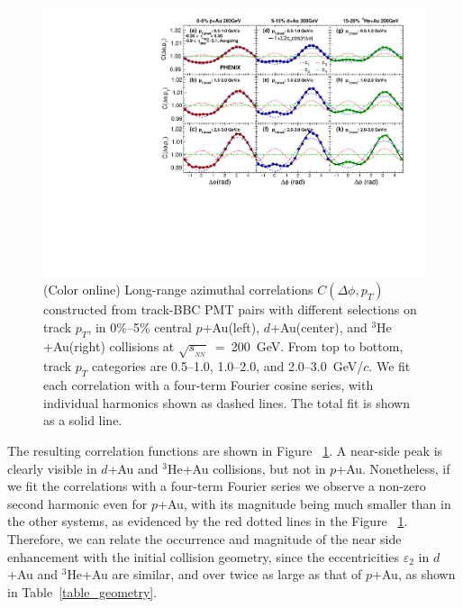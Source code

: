 \documentclass[%
reprint,
showpacs,preprintnumbers,
 amsmath,amssymb,
 aps,
]{revtex4-1}
\newcommand{\pt}{\mbox{$p_T$}\xspace}
\newcommand{\sqsn}{\mbox{$\sqrt{s_{_{NN}}}$}\xspace}
\newcommand{\dau}{\mbox{$d$+Au}\xspace}
\newcommand{\pau}{\mbox{$p$+Au}\xspace}
\newcommand{\hau}{\mbox{$^3\text{He}$+Au}\xspace}
\begin{document}
\begin{figure}[htbp]
  \includegraphics[scale=0.8]{Figures/figure1.pdf}
  \caption{(Color online) Long-range azimuthal correlations $C(\Delta\phi,p_{T})$ constructed from track-BBC PMT pairs with different selections on
track \pt, in 0\%--5\% central \pau (left), \dau (center), and \hau (right) collisions at \sqsn~=~200~GeV. From top to bottom,
track \pt categories are 0.5--1.0, 1.0--2.0, and 2.0--3.0~GeV/$c$. We fit each correlation with a four-term Fourier cosine series, with individual harmonics shown as dashed lines. The total fit is shown as a solid line.}
\label{fig:figure1}
\end{figure}

The resulting correlation functions are shown in Figure ~\ref{fig:figure1}. A near-side peak is clearly visible in \dau and \hau collisions, but not in \pau. Nonetheless, if we fit the correlations with a four-term Fourier series we observe a non-zero second harmonic even for \pau, with its magnitude being much smaller than in the other systems, as evidenced by the red dotted lines in the Figure ~\ref{fig:figure1}. Therefore, we can relate the occurrence and magnitude of the near side enhancement with the initial collision geometry, since the eccentricities $\varepsilon_2$ in \dau and \hau are similar, and over twice as large as that of \pau, as shown in Table~\ref{table_geometry}.
\end{document}
